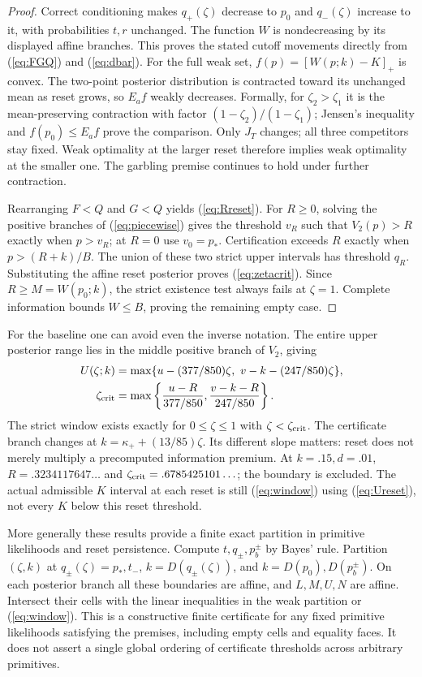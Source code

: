 \documentclass[11pt]{article}
\begin{document}
\begin{proof}
Correct conditioning makes $q_+(\zeta)$ decrease to $p_0$ and $q_-(\zeta)$ increase to it, with probabilities $t,r$ unchanged. The function $W$ is nondecreasing by its displayed affine branches. This proves the stated cutoff movements directly from (\ref{eq:FGQ}) and (\ref{eq:dbar}). For the full weak set, $f(p)=[W(p;k)-K]_+$ is convex. The two-point posterior distribution is contracted toward its unchanged mean as reset grows, so $E_af$ weakly decreases. Formally, for $\zeta_2>\zeta_1$ it is the mean-preserving contraction with factor $(1-\zeta_2)/(1-\zeta_1)$; Jensen's inequality and $f(p_0)\leq E_af$ prove the comparison. Only $J_T$ changes; all three competitors stay fixed. Weak optimality at the larger reset therefore implies weak optimality at the smaller one. The garbling premise continues to hold under further contraction.

Rearranging $F<Q$ and $G<Q$ yields (\ref{eq:Rreset}). For $R\geq0$, solving the positive branches of (\ref{eq:piecewise}) gives the threshold $v_R$ such that $V_2(p)>R$ exactly when $p>v_R$; at $R=0$ use $v_0=p_*$. Certification exceeds $R$ exactly when $p>(R+k)/B$. The union of these two strict upper intervals has threshold $q_R$. Substituting the affine reset posterior proves (\ref{eq:zetacrit}). Since $R\geq M=W(p_0;k)$, the strict existence test always fails at $\zeta=1$. Complete information bounds $W\leq B$, proving the remaining empty case.
\end{proof}

For the baseline one can avoid even the inverse notation. The entire upper posterior range lies in the middle positive branch of $V_2$, giving
\begin{align}
 U(\zeta;k)&=\max\{u-(377/850)\zeta,\ v-k-(247/850)\zeta\},\label{eq:Ureset}\\
 \zeta_{\rm crit}&=\max\left\{\frac{u-R}{377/850},\frac{v-k-R}{247/850}\right\}.\label{eq:zetabase}
\end{align}
The strict window exists exactly for $0\leq\zeta\leq1$ with $\zeta<\zeta_{\rm crit}$. The certificate branch changes at $k=\kappa_++(13/85)\zeta$. Its different slope matters: reset does not merely multiply a precomputed information premium. At $k=.15,d=.01$, $R=.3234117647\ldots$ and $\zeta_{\rm crit}=.6785425101\ldots$; the boundary is excluded. The actual admissible $K$ interval at each reset is still (\ref{eq:window}) using (\ref{eq:Ureset}), not every $K$ below this reset threshold.

More generally these results provide a finite exact partition in primitive likelihoods and reset persistence. Compute $t,q_\pm,p_b^\pm$ by Bayes' rule. Partition $(\zeta,k)$ at $q_\pm(\zeta)=p_*,t_-$, $k=D(q_\pm(\zeta))$, and $k=D(p_0),D(p_b^\pm)$. On each posterior branch all these boundaries are affine, and $L,M,U,N$ are affine. Intersect their cells with the linear inequalities in the weak partition or (\ref{eq:window}). This is a constructive finite certificate for any fixed primitive likelihoods satisfying the premises, including empty cells and equality faces. It does not assert a single global ordering of certificate thresholds across arbitrary primitives.
\end{document}
